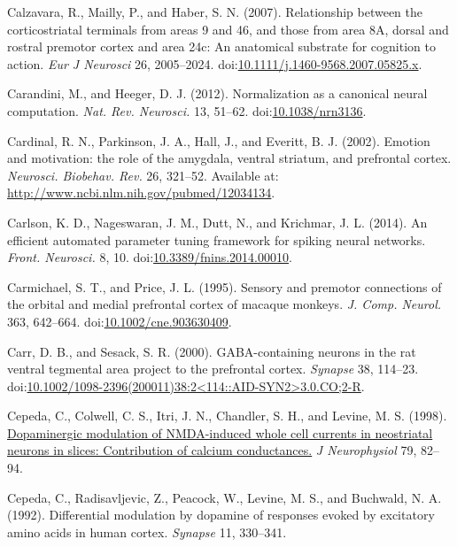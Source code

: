 \documentclass[
  11pt,
  a4paper,
]{scrbook}
\newlength{\cslhangindent}
\newenvironment{CSLReferences}[2] %
 {\begin{list}{}{%
  \setlength{\itemindent}{0pt}
  \setlength{\leftmargin}{0pt}
  \setlength{\parsep}{0pt}
  \ifodd #1
   \setlength{\leftmargin}{\cslhangindent}
   \setlength{\itemindent}{-1\cslhangindent}
  \fi
  \setlength{\itemsep}{#2\baselineskip}}}
 {\end{list}}
\begin{document}
\begin{CSLReferences}{1}{1}
Calzavara, R., Mailly, P., and Haber, S. N. (2007). Relationship between
the corticostriatal terminals from areas 9 and 46, and those from area
8A, dorsal and rostral premotor cortex and area 24c: An anatomical
substrate for cognition to action. \emph{Eur J Neurosci} 26, 2005--2024.
doi:\href{https://doi.org/10.1111/j.1460-9568.2007.05825.x}{10.1111/j.1460-9568.2007.05825.x}.

Carandini, M., and Heeger, D. J. (2012). {Normalization as a canonical
neural computation.} \emph{Nat. Rev. Neurosci.} 13, 51--62.
doi:\href{https://doi.org/10.1038/nrn3136}{10.1038/nrn3136}.

Cardinal, R. N., Parkinson, J. A., Hall, J., and Everitt, B. J. (2002).
{Emotion and motivation: the role of the amygdala, ventral striatum, and
prefrontal cortex.} \emph{Neurosci. Biobehav. Rev.} 26, 321--52.
Available at: \url{http://www.ncbi.nlm.nih.gov/pubmed/12034134}.

Carlson, K. D., Nageswaran, J. M., Dutt, N., and Krichmar, J. L. (2014).
{An efficient automated parameter tuning framework for spiking neural
networks.} \emph{Front. Neurosci.} 8, 10.
doi:\href{https://doi.org/10.3389/fnins.2014.00010}{10.3389/fnins.2014.00010}.

Carmichael, S. T., and Price, J. L. (1995). {Sensory and premotor
connections of the orbital and medial prefrontal cortex of macaque
monkeys.} \emph{J. Comp. Neurol.} 363, 642--664.
doi:\href{https://doi.org/10.1002/cne.903630409}{10.1002/cne.903630409}.

Carr, D. B., and Sesack, S. R. (2000). {GABA-containing neurons in the
rat ventral tegmental area project to the prefrontal cortex.}
\emph{Synapse} 38, 114--23.
doi:\href{https://doi.org/10.1002/1098-2396(200011)38:2\%3C114::AID-SYN2\%3E3.0.CO;2-R}{10.1002/1098-2396(200011)38:2\textless114::AID-SYN2\textgreater3.0.CO;2-R}.

Cepeda, C., Colwell, C. S., Itri, J. N., Chandler, S. H., and Levine, M.
S. (1998).
\href{https://www.ncbi.nlm.nih.gov/pubmed/9425179}{Dopaminergic
modulation of NMDA-induced whole cell currents in neostriatal neurons in
slices: Contribution of calcium conductances.} \emph{J Neurophysiol} 79,
82--94.

Cepeda, C., Radisavljevic, Z., Peacock, W., Levine, M. S., and Buchwald,
N. A. (1992). Differential modulation by dopamine of responses evoked by
excitatory amino acids in human cortex. \emph{Synapse} 11, 330--341.


\end{CSLReferences}
\end{document}
